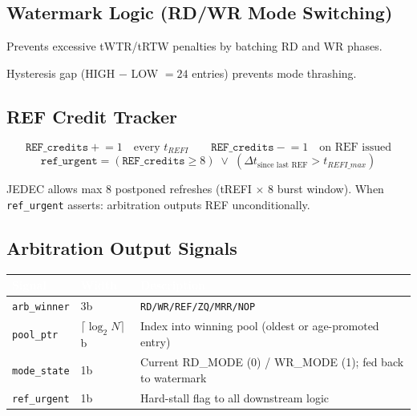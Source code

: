 \documentclass[11pt,a4paper]{article}
\newcommand{\THead}[1]{\cellcolor{navy}\textcolor{white}{\small\textbf{#1}}}
\newcommand{\RA}{\rowcolor{lgray}}
\newcommand{\RB}{\rowcolor{sky!30}}
\begin{document}
\subsection{Watermark Logic (RD/WR Mode Switching)}

Prevents excessive tWTR/tRTW penalties by batching RD and WR phases.

\begin{center}
\end{center}

Hysteresis gap (HIGH $-$ LOW $= 24$ entries) prevents mode thrashing.

\subsection{REF Credit Tracker}

\[
\texttt{REF\_credits} \mathrel{+}= 1 \quad \text{every } t_{REFI}
\qquad
\texttt{REF\_credits} \mathrel{-}= 1 \quad \text{on REF issued}
\]
\[
\texttt{ref\_urgent} = (\texttt{REF\_credits} \geq 8)
\;\vee\;
(\Delta t_{\text{since last REF}} > t_{REFI\_max})
\]

JEDEC allows max 8 postponed refreshes (tREFI $\times$ 8 burst window).
When \texttt{ref\_urgent} asserts: arbitration outputs REF unconditionally.

\subsection{Arbitration Output Signals}

\begin{center}
\begin{tabularx}{0.85\linewidth}{@{} l l X @{}}
\toprule
\THead{Signal} & \THead{Width} & \THead{Description} \\
\midrule
\RA \texttt{arb\_winner} & 3b &
  \texttt{RD/WR/REF/ZQ/MRR/NOP} \\
\RB \texttt{pool\_ptr} & $\lceil\log_2 N\rceil$b &
  Index into winning pool (oldest or age-promoted entry) \\
\RA \texttt{mode\_state} & 1b &
  Current RD\_MODE (0) / WR\_MODE (1); fed back to watermark \\
\RB \texttt{ref\_urgent} & 1b &
  Hard-stall flag to all downstream logic \\
\bottomrule
\end{tabularx}
\end{center}
\end{document}
